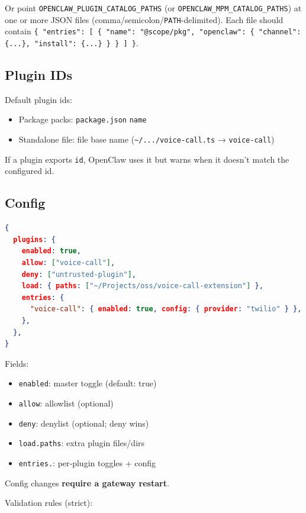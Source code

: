 Or point \texttt{OPENCLAW\_PLUGIN\_CATALOG\_PATHS} (or \texttt{OPENCLAW\_MPM\_CATALOG\_PATHS}) at
one or more JSON files (comma/semicolon/\texttt{PATH}-delimited). Each file should
contain \texttt{\{ "entries": [ \{ "name": "@scope/pkg", "openclaw": \{ "channel": \{...\}, "install": \{...\} \} \} ] \}}.

\subsection{Plugin IDs}


Default plugin ids:

\begin{itemize}
  \item Package packs: \texttt{package.json} \texttt{name}
  \item Standalone file: file base name (\texttt{\textasciitilde{}/.../voice-call.ts} → \texttt{voice-call})
\end{itemize}


If a plugin exports \texttt{id}, OpenClaw uses it but warns when it doesn’t match the
configured id.

\subsection{Config}


\begin{lstlisting}[language=json]
{
  plugins: {
    enabled: true,
    allow: ["voice-call"],
    deny: ["untrusted-plugin"],
    load: { paths: ["~/Projects/oss/voice-call-extension"] },
    entries: {
      "voice-call": { enabled: true, config: { provider: "twilio" } },
    },
  },
}
\end{lstlisting}


Fields:

\begin{itemize}
  \item \texttt{enabled}: master toggle (default: true)
  \item \texttt{allow}: allowlist (optional)
  \item \texttt{deny}: denylist (optional; deny wins)
  \item \texttt{load.paths}: extra plugin files/dirs
  \item \texttt{entries.}: per‑plugin toggles + config
\end{itemize}


Config changes \textbf{require a gateway restart}.

Validation rules (strict):

